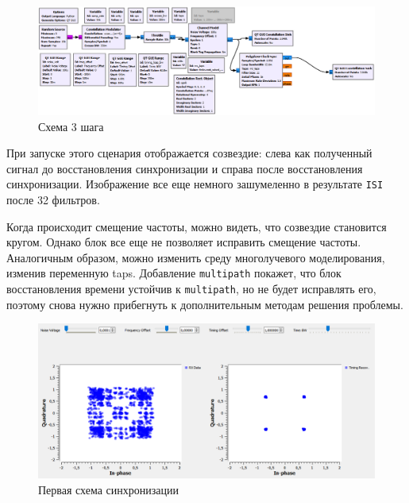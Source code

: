 \documentclass[a4paper]{article}
\begin{document}
            \begin{figure}[H]
                \centering
                \includegraphics[width=\textwidth]{ex_4_1.png}
                \caption{Схема 3 шага}
                \label{fig:ex_4_1}
            \end{figure}
            
            При запуске этого сценария отображается созвездие: слева как полученный сигнал до восстановления синхронизации и справа после восстановления синхронизации. Изображение все еще немного зашумеленно в результате \texttt{ISI} после 32 фильтров.
            
            Когда происходит смещение частоты, можно видеть, что созвездие становится кругом. Однако блок все еще не позволяет исправить смещение частоты. Аналогичным образом, можно изменить среду многолучевого моделирования, изменив переменную taps. Добавление \texttt{multipath} покажет, что блок восстановления времени устойчив к \texttt{multipath}, но не будет исправлять его, поэтому снова нужно прибегнуть к дополнительным методам решения проблемы.
            
            \begin{figure}[H]
                \centering
                \includegraphics[width=\textwidth]{ex_4_2.png}
                \caption{Первая схема синхронизации}
                \label{fig:ex_4_2}
            \end{figure}
            
\end{document}

